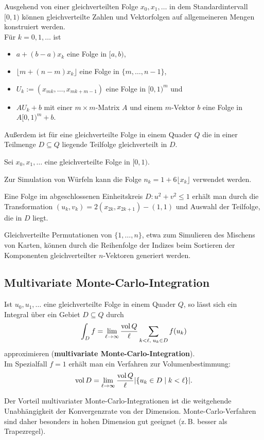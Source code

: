 Ausgehend von einer gleichverteilten Folge $x_0, x_1, \dotsc$ in dem
Standardintervall $[0, 1)$ können gleichverteilte Zahlen und Vektorfolgen
auf allgemeineren Mengen konstruiert werden. \\
Für $k = 0, 1, \dotsc$ ist
\begin{itemize}
    \item
    $a + (b - a)x_k$ eine Folge in $[a, b)$,

    \item
    $\lfloor m + (n - m)x_k \rfloor$ eine Folge in $\{m, \dotsc, n - 1\}$,

    \item
    $U_k := (x_{mk}, \dotsc, x_{mk + m - 1})$ eine Folge in $[0, 1)^m$ und

    \item
    $A U_k + b$ mit einer $m \times m$-Matrix $A$ und einem $m$-Vektor $b$
    eine Folge in $A[0,1)^m + b$.
\end{itemize}
Außerdem ist für eine gleichverteilte Folge in einem Quader $Q$ die in einer
Teilmenge $D \subseteq Q$ liegende Teilfolge gleichverteilt in $D$.

\linie

Sei $x_0, x_1, \dotsc$ eine gleichverteilte Folge in $[0, 1)$.

Zur Simulation von Würfeln kann die Folge
$n_k = 1 + 6 \lfloor x_k \rfloor$ verwendet werden.

Eine Folge im abgeschlossenen Einheitskreis $D\colon u^2 + v^2 \le 1$
erhält man durch die Transformation $(u_k, v_k) = 2(x_{2k}, x_{2k+1}) - (1, 1)$
und Auswahl der Teilfolge, die in $D$ liegt.

Gleichverteilte Permutationen von $\{1, \dotsc, n\}$, etwa zum Simulieren
des Mischens von Karten, können durch die Reihenfolge der Indizes beim
Sortieren der Komponenten gleichverteilter $n$-Vektoren generiert werden.

\subsection{%
    Multivariate Monte-Carlo-Integration%
}

Ist $u_0, u_1, \dotsc$ eine gleichverteilte Folge in einem Quader $Q$, so lässt
sich ein Integral über ein Gebiet $D \subseteq Q$ durch
\begin{align*}
    \int_D f = \lim_{\ell \to \infty} \frac{\operatorname{vol} Q}{\ell}
    \sum_{k < \ell,\; u_k \in D} f(u_k)
\end{align*}
approximieren (\textbf{multivariate Monte-Carlo-Integration}). \\
Im Spezialfall $f = 1$ erhält man ein Verfahren zur Volumenbestimmung:
\begin{align*}
    \operatorname{vol} D = \lim_{\ell \to \infty} \frac{\operatorname{vol} Q}{\ell}
    |\{u_k \in D \;|\; k < \ell\}|.
\end{align*}

\linie

Der Vorteil multivariater Monte-Carlo-Integrationen ist die weitgehende
Unabhängigkeit der Konvergenzrate von der Dimension.
Monte-Carlo-Verfahren sind daher besonders in hohen Dimension gut geeignet
(z.\,B. besser als Trapezregel).

\pagebreak
